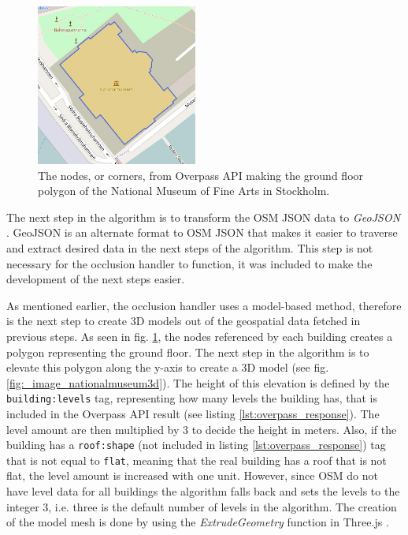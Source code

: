 \begin{figure}
\includegraphics[height=200px, width=200px]{_image_nationalmuseum2d}
\caption{The nodes, or corners, from Overpass API making the ground floor polygon of the National Museum of Fine Arts in Stockholm.}
\label{fig:_image_nationalmuseum2d}
\end{figure}

The next step in the algorithm is to transform the OSM JSON data to \textit{GeoJSON} \cite{geojson}. GeoJSON is an alternate format to OSM JSON that makes it easier to traverse and extract desired data in the next steps of the algorithm. This step is not necessary for the occlusion handler to function, it was included to make the development of the next steps easier.

As mentioned earlier, the occlusion handler uses a model-based method, therefore is the next step to create 3D models out of the geospatial data fetched in previous steps. As seen in fig. \ref{fig:_image_nationalmuseum2d}, the nodes referenced by each building creates a polygon representing the ground floor. The next step in the algorithm is to elevate this polygon along the y-axis to create a 3D model (see fig.  \ref{fig:_image_nationalmuseum3d}). The height of this elevation is defined by the \texttt{building:levels} tag, representing how many levels the building has, that is included in the Overpass API result (see listing \ref{lst:overpass_response}). The level amount are then multiplied by 3 to decide the height in meters. Also, if the building has a \texttt{roof:shape} (not included in listing \ref{lst:overpass_response}) tag that is not equal to \texttt{flat}, meaning that the real building has a roof that is not flat, the level amount is increased with one unit. However, since OSM do not have level data for all buildings the algorithm falls back and sets the levels to the integer 3, i.e. three is the default number of levels in the algorithm. The creation of the model mesh is done by using the \textit{ExtrudeGeometry} function in Three.js \cite{threejsExtrudegeometry}. 


